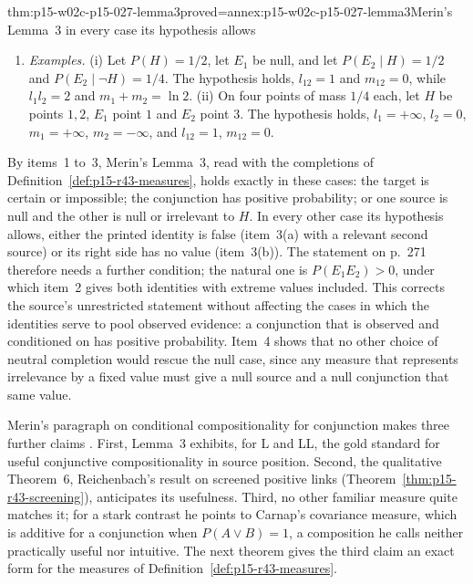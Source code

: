 \begin{hbtheorem}{thm:p15-w02c-p15-027-lemma3}{proved=annex:p15-w02c-p15-027-lemma3}{Merin's Lemma~3 in every case its hypothesis allows}
\begin{enumerate}
  when \(\iota_T=1\), and
  \(R_T(EE'\Yright H)_P=R_T(E\Yright H)_P+R_T(E'\Yright H)_P\) fails when
  \(\iota_T=0\), whenever \(E'\) is relevant to \(H\).
\item \emph{Examples.} (i) Let \(P(H)=1/2\), let \(E_1\) be null, and let
  \(P(E_2\mid H)=1/2\) and \(P(E_2\mid\neg H)=1/4\). The hypothesis holds,
  \(l_{12}=1\) and \(m_{12}=0\), while \(l_1l_2=2\) and
  \(m_1+m_2=\ln2\). (ii) On four points of mass \(1/4\) each, let \(H\)
  be points \(1,2\), \(E_1\) point \(1\) and \(E_2\) point \(3\). The
  hypothesis holds, \(l_1=+\infty\), \(l_2=0\), \(m_1=+\infty\),
  \(m_2=-\infty\), and \(l_{12}=1\), \(m_{12}=0\).
\end{enumerate}
\end{hbtheorem}

By items~1 to~3, Merin's Lemma~3, read with the completions of
Definition~\ref{def:p15-r43-measures}, holds exactly in these cases: the target is
certain or impossible; the conjunction has positive probability; or one
source is null and the other is null or irrelevant to \(H\). In every
other case its hypothesis allows, either the printed identity is false
(item~3(a) with a relevant second source) or its right side has no value
(item~3(b)). The statement on p.~271 therefore needs a further
condition; the natural one is \(P(E_1E_2)>0\), under which item~2 gives
both identities with extreme values included. This corrects the
source's unrestricted statement without affecting the cases in which the
identities serve to pool observed evidence: a conjunction that is
observed and conditioned on has positive probability. Item~4 shows that no other choice of neutral completion
would rescue the null case, since any measure that represents
irrelevance by a fixed value must give a null source and a null
conjunction that same value.

Merin's paragraph on conditional compositionality for conjunction makes
three further claims \cite[p.~272]{Merin2021Relevance}. First, Lemma~3
exhibits, for L and LL, the gold standard for useful conjunctive
compositionality in source position. Second, the qualitative
Theorem~6, Reichenbach's result on screened positive links
(Theorem~\ref{thm:p15-r43-screening}), anticipates its usefulness.
Third, no other familiar measure quite matches it; for a stark contrast
he points to Carnap's covariance measure, which is additive for a
conjunction when \(P(A\vee B)=1\), a composition he calls neither
practically useful nor intuitive. The next theorem gives the third
claim an exact form for the measures of Definition~\ref{def:p15-r43-measures}.

